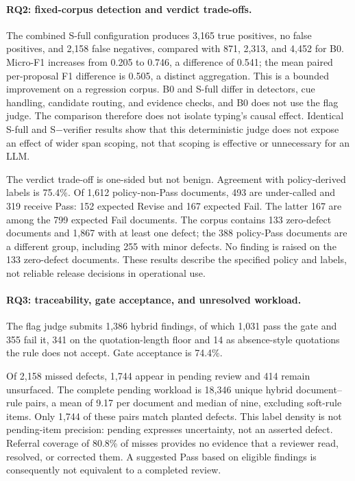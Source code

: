 \documentclass[computers,article,submit,moreauthors]{Definitions/mdpi}
\begin{document}
\paragraph{RQ2: fixed-corpus detection and verdict trade-offs.}
The combined S-full configuration produces 3,165 true positives, no false positives, and 2,158 false negatives, compared with 871, 2,313, and 4,452 for B0. Micro-F1 increases from 0.205 to 0.746, a difference of 0.541; the mean paired per-proposal F1 difference is 0.505, a distinct aggregation. This is a bounded improvement on a regression corpus. B0 and S-full differ in detectors, cue handling, candidate routing, and evidence checks, and B0 does not use the flag judge. The comparison therefore does not isolate typing's causal effect. Identical S-full and S$-$verifier results show that this deterministic judge does not expose an effect of wider span scoping, not that scoping is effective or unnecessary for an LLM.

The verdict trade-off is one-sided but not benign. Agreement with policy-derived labels is 75.4\%. Of 1,612 policy-non-Pass documents, 493 are under-called and 319 receive Pass: 152 expected Revise and 167 expected Fail. The latter 167 are among the 799 expected Fail documents. The corpus contains 133 zero-defect documents and 1,867 with at least one defect; the 388 policy-Pass documents are a different group, including 255 with minor defects. No finding is raised on the 133 zero-defect documents. These results describe the specified policy and labels, not reliable release decisions in operational use.

\paragraph{RQ3: traceability, gate acceptance, and unresolved workload.}
The flag judge submits 1,386 hybrid findings, of which 1,031 pass the gate and 355 fail it, 341 on the quotation-length floor and 14 as absence-style quotations the rule does not accept. Gate acceptance is 74.4\%. 

Of 2,158 missed defects, 1,744 appear in pending review and 414 remain unsurfaced. The complete pending workload is 18,346 unique hybrid document--rule pairs, a mean of 9.17 per document and median of nine, excluding soft-rule items. Only 1,744 of these pairs match planted defects. This label density is not pending-item precision: pending expresses uncertainty, not an asserted defect. Referral coverage of 80.8\% of misses provides no evidence that a reviewer read, resolved, or corrected them. A suggested Pass based on eligible findings is consequently not equivalent to a completed review.
\end{document}
